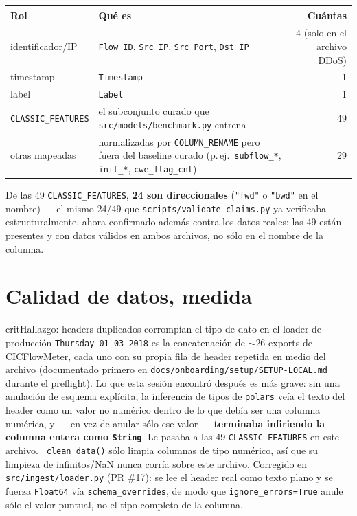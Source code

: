 \documentclass[11pt]{article}
\newcommand{\code}[1]{\texttt{\small #1}}
\begin{document}
\begin{center}
\begin{tabular}{@{}lp{9.5cm}r@{}}
\toprule
\textbf{Rol} & \textbf{Qué es} & \textbf{Cuántas} \\
\midrule
identificador/IP & \code{Flow ID}, \code{Src IP}, \code{Src Port}, \code{Dst IP} & 4 (solo en el archivo DDoS) \\
timestamp & \code{Timestamp} & 1 \\
label & \code{Label} & 1 \\
\code{CLASSIC\_FEATURES} & el subconjunto curado que \code{src/models/benchmark.py} entrena & 49 \\
otras mapeadas & normalizadas por \code{COLUMN\_RENAME} pero fuera del baseline curado (p.\,ej.\ \code{subflow\_*}, \code{init\_*}, \code{cwe\_flag\_cnt}) & 29 \\
\bottomrule
\end{tabular}
\end{center}

De las 49 \code{CLASSIC\_FEATURES}, \textbf{24 son direccionales} (\code{"fwd"} o \code{"bwd"}
en el nombre) --- el mismo 24/49 que \code{scripts/validate\_claims.py} ya verificaba
estructuralmente, ahora confirmado además contra los datos reales: las 49 están presentes y
con datos válidos en ambos archivos, no sólo en el nombre de la columna.

\section{Calidad de datos, medida}

\begin{cbox}{crit}{Hallazgo: headers duplicados corrompían el tipo de dato en el loader de producción}
\code{Thursday-01-03-2018} es la concatenación de $\sim$26 exports de CICFlowMeter, cada
uno con su propia fila de header repetida en medio del archivo (documentado primero en
\code{docs/onboarding/setup/SETUP-LOCAL.md} durante el preflight). Lo que esta sesión
encontró después es más grave: sin una anulación de esquema explícita, la inferencia de
tipos de \code{polars} veía el texto del header como un valor no numérico dentro de lo que
debía ser una columna numérica, y --- en vez de anular sólo ese valor --- \textbf{terminaba infiriendo
la columna entera como \code{String}}. Le pasaba a las 49 \code{CLASSIC\_FEATURES} en este
archivo. \code{\_clean\_data()} sólo limpia columnas de tipo numérico, así que su limpieza
de infinitos/NaN nunca corría sobre este archivo. Corregido en \code{src/ingest/loader.py}
(PR \#17): se lee el header real como texto plano y se fuerza \code{Float64} vía
\code{schema\_overrides}, de modo que \code{ignore\_errors=True} anule sólo el valor
puntual, no el tipo completo de la columna.
\end{cbox}
\end{document}

